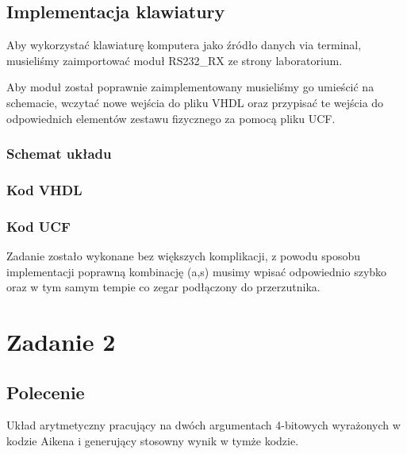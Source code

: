 \documentclass[a4paper,12pt]{extarticle}  %
\begin{document}
\subsection{Implementacja klawiatury}
Aby wykorzystać klawiaturę komputera jako źródło danych via terminal, musieliśmy zaimportować moduł RS232\_RX ze strony laboratorium.

Aby moduł został poprawnie zaimplementowany musieliśmy go umieścić na schemacie, 
wczytać nowe wejścia do pliku VHDL oraz przypisać te wejścia do 
odpowiednich elementów zestawu fizycznego za pomocą pliku UCF.
\subsubsection{Schemat układu}
\begin{figure}[H]
	\centering
\end{figure}
\subsubsection{Kod VHDL}

\subsubsection{Kod UCF}


Zadanie zostało wykonane bez większych komplikacji, z powodu sposobu implementacji poprawną kombinację (a,s) musimy wpisać odpowiednio szybko oraz w tym samym tempie co zegar podłączony do przerzutnika.
\section{Zadanie 2}
\subsection{Polecenie}
Układ arytmetyczny pracujący na dwóch argumentach 4-bitowych wyrażonych w kodzie Aikena
i generujący stosowny wynik w tymże kodzie. 
\end{document}
